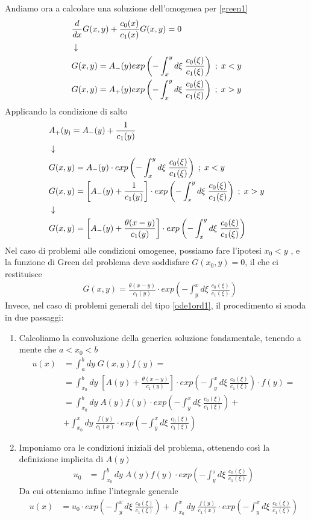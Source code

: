 \newpage
Andiamo ora a calcolare una soluzione dell'omogenea per \ref{green1}
\begin{align}
	&\frac{d}{dx}G(x,y) + \frac{c_0(x)}{c_1(x)} G(x,y)  = 0\\ &\downarrow \nonumber \\
	&G(x,y) = A_-(y) exp\left( - \int_{x}^{y} d\xi\; \frac{c_0(\xi)}{c_1(\xi)}\right) \; ; \;  x<y\\
	&G(x,y) = A_+(y) exp\left( - \int_{x}^{y} d\xi\; \frac{c_0(\xi)}{c_1(\xi)}\right) \; ; \; x>y
\end{align}
Applicando la condizione di salto
\begin{align}
	&A_+(y_) = A_-(y) + \frac{1}{c_1(y)} \\ &\downarrow \nonumber \\
	&G(x,y) = A_-(y) \cdot exp\left( - \int_{x}^{y} d\xi\; \frac{c_0(\xi)}{c_1(\xi)}\right) \; ; \;  x<y\\
	&G(x,y) = \left[  A_-(y) + \frac{1}{c_1(y)} \right] \cdot exp\left( - \int_{x}^{y} d\xi\; \frac{c_0(\xi)}{c_1(\xi)}\right) \; ; \;  x>y \\ &\downarrow \nonumber \\
	&G(x,y) = \left[  A_-(y) + \frac{\theta(x-y)}{c_1(y)} \right] \cdot exp\left( - \int_{x}^{y} d\xi\; \frac{c_0(\xi)}{c_1(\xi)}\right)	
\end{align}
Nel caso di problemi alle condizioni omogenee, possiamo fare l'ipotesi $x_0 < y$ , e la funzione di Green del problema deve soddisfare $G(x_0,y) = 0$, il che ci restituisce
\begin{align}
&G(x,y) = \frac{\theta(x-y)}{c_1(y)} \cdot exp\left( - \int_{y}^{x} d\xi\; \frac{c_0(\xi)}{c_1(\xi)}\right)	
\end{align}
Invece, nel caso di problemi generali del tipo \ref{ode1ord1}, il procedimento si snoda in due passaggi:
\begin{enumerate}
	\item Calcoliamo la convoluzione della generica soluzione fondamentale, tenendo a mente che $a<x_0<b$
	\begin{align}
		u(x) &= \int_a^b dy \; G(x,y) f(y) =	\nonumber\\
			 &= \int_{x_0}^b dy \;\left[  A(y) + \frac{\theta(x-y)}{c_1(y)} \right] \cdot exp\left( - \int_{y}^{x} d\xi\; \frac{c_0(\xi)}{c_1(\xi)}\right) \cdot f(y) =	\nonumber\\
			 &= \int_{x_0}^b dy \; A(y) f(y) \cdot exp\left( - \int_{y}^{x} d\xi\; \frac{c_0(\xi)}{c_1(\xi)}\right) + \nonumber\\
			 &+ \int_{x_0}^x dy \;  \frac{f(y)}{c_1(x)} \cdot exp\left( - \int_{y}^{x} d\xi\; \frac{c_0(\xi)}{c_1(\xi)}\right) 
	\end{align}
	\item Imponiamo ora le condizioni iniziali del problema, ottenendo così la definizione implicita di $A(y)$
	\begin{align}
		u_0 &= \int_{x_0}^b dy \; A(y) f(y) \cdot exp\left( - \int_{y}^{_0} d\xi\; \frac{c_0(\xi)}{c_1(\xi)}\right) 
	\end{align}
	Da cui otteniamo infine l'integrale generale
	\begin{align}
		u(x) &= u_0 \cdot  exp\left( - \int_{y}^{x} d\xi\; \frac{c_0(\xi)}{c_1(\xi)}\right) + \int_{x_0}^x dy \;  \frac{f(y)}{c_1(x)} \cdot exp\left( - \int_{y}^{x} d\xi\; \frac{c_0(\xi)}{c_1(\xi)}\right) 
	\end{align}
\end{enumerate}

